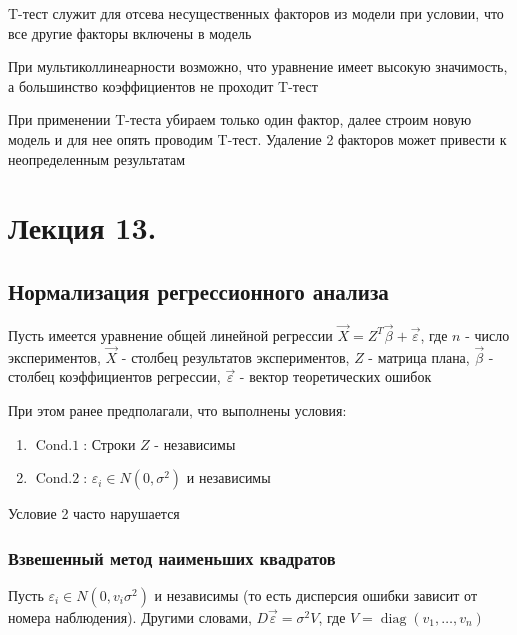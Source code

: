 \documentclass[12pt]{article}
\begin{document}
\begin{enumerate}[label*=\asbuk*) ]
    \Nota T-тест служит для отсева несущественных факторов из модели при условии, что все другие факторы включены в модель

    \Notas При мультиколлинеарности возможно, что уравнение имеет высокую значимость, а большинство коэффициентов не проходит T-тест 

    \Notas При применении T-теста убираем только один фактор, далее строим новую модель и для нее опять проводим T-тест. Удаление 2 факторов может привести к неопределенным результатам
\end{enumerate}







\section{Лекция 13.}

\subsection{Нормализация регрессионного анализа}

Пусть имеется уравнение общей линейной регрессии $\vec X = Z^T \vec \beta + \vec \varepsilon$, где $n$ - число экспериментов, $\vec X$ - столбец результатов экспериментов, $Z$ - матрица плана, $\vec \beta$ - столбец коэффициентов регрессии, $\vec \varepsilon$ - вектор теоретических ошибок

При этом ранее предполагали, что выполнены условия:

\begin{enumerate}
    \item $\operatorname{Cond. 1}$: Строки $Z$ - независимы
    \item $\operatorname{Cond. 2}$: $\varepsilon_i \in N(0, \sigma^2)$ и независимы
\end{enumerate}

Условие 2 часто нарушается

\subsubsection{Взвешенный метод наименьших квадратов}

Пусть $\varepsilon_i \in N(0, v_i \sigma^2)$ и независимы (то есть дисперсия ошибки зависит от номера наблюдения). Другими словами, $D \vec \varepsilon = \sigma^2 V$, где $V = \operatorname{diag} (v_1, \dots, v_n)$
\end{document}
